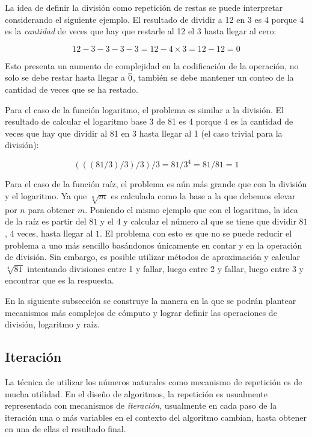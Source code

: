 La idea de definir la división como repetición de restas se puede interpretar considerando el siguiente ejemplo. El resultado de dividir a 12 en 3 es 4 porque 4 es la \emph{cantidad} de veces que hay que restarle al 12 el 3 hasta llegar al cero:

\[ 12-3-3-3-3=12-4\times 3=12-12=0 \]

Esto presenta un aumento de complejidad en la codificación de la operación, no solo se debe restar hasta llegar a \( \widehat{0} \), también se debe mantener un conteo de la cantidad de veces que se ha restado.

Para el caso de la función logaritmo, el problema es similar a la división. El resultado de calcular el logaritmo base 3 de 81 es 4 porque 4 es la cantidad de veces que hay que dividir al 81 en 3 hasta llegar al 1 (el caso trivial para la división):

\[ (((81/3)/3)/3)/3 = 81/3^{4} = 81/81 = 1 \]

Para el caso de la función raíz, el problema es aún más grande que con la división y el logaritmo. Ya que \( \sqrt[n]{m} \) es calculada como la base a la que debemos elevar por \( n \) para obtener \( m \). Poniendo el mismo ejemplo que con el logaritmo, la idea de la raíz es partir del \( 81 \) y el \( 4 \) y calcular el número al que se tiene que dividir \( 81 \), \( 4 \) veces, hasta llegar al \( 1 \). El problema con esto es que no se puede reducir el problema a uno más sencillo basándonos únicamente en contar y en la operación de división. Sin embargo, es posible utilizar métodos de aproximación y calcular \( \sqrt[4]{81} \) intentando divisiones entre 1 y fallar, luego entre 2 y fallar, luego entre 3 y encontrar que es la respuesta.

En la siguiente subsección se construye la manera en la que se podrán plantear mecanismos más complejos de cómputo y lograr definir las operaciones de división, logaritmo y raíz.



\subsection{Iteración}
\label{sec:iteracion}

La técnica de utilizar los números naturales como mecanismo de repetición es de mucha utilidad. En el diseño de algoritmos, la repetición es usualmente representada con mecanismos de \emph{iteración}, usualmente en cada paso de la iteración una o más variables en el contexto del algoritmo cambian, hasta obtener en una de ellas el resultado final.

